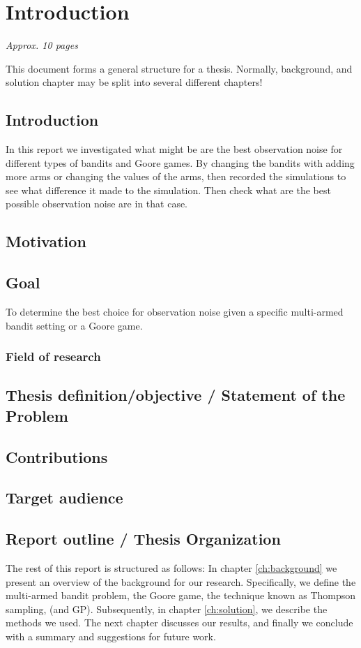 \chapter{Introduction}
\label{ch:introduction}

\textit{Approx. 10 pages}

This document forms a general structure for a thesis. Normally, background, and
solution chapter may be split into several different chapters!

\section{Introduction}

In this report we investigated what might be are the best observation noise for
different types of bandits and Goore games. By changing the bandits with adding
more arms or changing the values of the arms, then recorded the simulations to
see what difference it made to the simulation. Then check what are the best
possible observation noise are in that case.

\section{Motivation}

\section{Goal} 
To determine the best choice for observation noise given a
specific multi-armed bandit setting or a Goore game.

\subsection{Field of research}

\section{Thesis definition/objective / Statement of the Problem}

\section{Contributions}
 
\section{Target audience}


\section{Report outline / Thesis Organization}

The rest of this report is structured as follows: In chapter
\ref{ch:background} we present an overview of the background for our research.
Specifically, we define the multi-armed bandit problem, the Goore game, the
technique known as Thompson sampling, (and GP). Subsequently, in chapter
\ref{ch:solution}, we describe the methods we used. The next chapter discusses
our results, and finally we conclude with a summary and suggestions for future
work.
